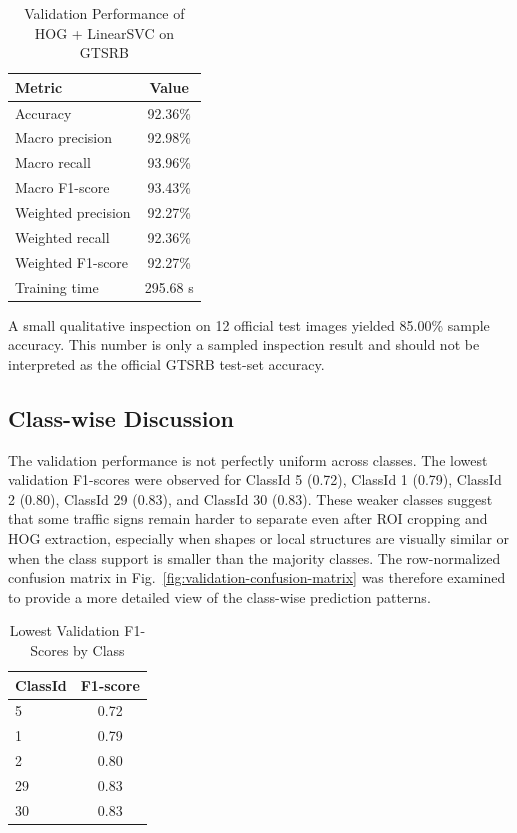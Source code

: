 \documentclass[conference]{IEEEtran}
\begin{document}
\begin{table}[htbp]
\caption{Validation Performance of HOG + LinearSVC on GTSRB}
\label{tab:validation_metrics}
\centering
\begin{tabular}{lc}
\toprule
Metric & Value\\
\midrule
Accuracy & 92.36\%\\
Macro precision & 92.98\%\\
Macro recall & 93.96\%\\
Macro F1-score & 93.43\%\\
Weighted precision & 92.27\%\\
Weighted recall & 92.36\%\\
Weighted F1-score & 92.27\%\\
Training time & 295.68 s\\
\bottomrule
\end{tabular}
\end{table}

A small qualitative inspection on 12 official test images yielded 85.00\% sample accuracy. This number is only a sampled inspection result and should not be interpreted as the official GTSRB test-set accuracy.

\subsection{Class-wise Discussion}

The validation performance is not perfectly uniform across classes. The lowest validation F1-scores were observed for ClassId 5 (0.72), ClassId 1 (0.79), ClassId 2 (0.80), ClassId 29 (0.83), and ClassId 30 (0.83). These weaker classes suggest that some traffic signs remain harder to separate even after ROI cropping and HOG extraction, especially when shapes or local structures are visually similar or when the class support is smaller than the majority classes. The row-normalized confusion matrix in Fig.~\ref{fig:validation-confusion-matrix} was therefore examined to provide a more detailed view of the class-wise prediction patterns.

\begin{table}[htbp]
\caption{Lowest Validation F1-Scores by Class}
\label{tab:weak_classes}
\centering
\begin{tabular}{lc}
\toprule
ClassId & F1-score\\
\midrule
5 & 0.72\\
1 & 0.79\\
2 & 0.80\\
29 & 0.83\\
30 & 0.83\\
\bottomrule
\end{tabular}
\end{table}
\end{document}
